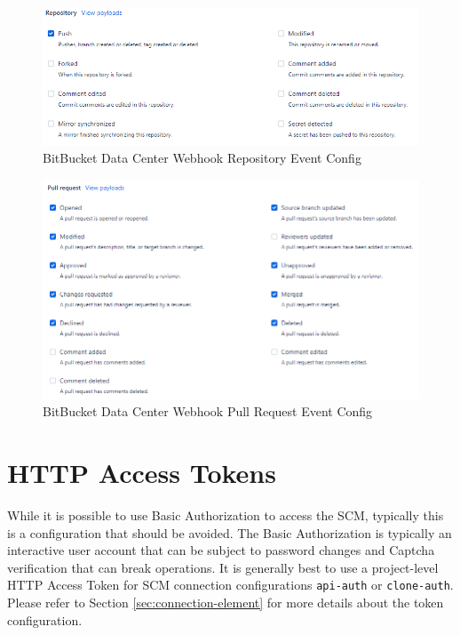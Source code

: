 \begin{figure}[h]
    \includegraphics[width=\textwidth]{graphics/bbdc-repository-event-config.png}
    \caption{BitBucket Data Center Webhook Repository Event Config}
    \label{fig:bbdc-repo-event-config}
\end{figure}

\begin{figure}[h]
    \includegraphics[width=\textwidth]{graphics/bbdc-pr-event-config.png}
    \caption{BitBucket Data Center Webhook Pull Request Event Config}
    \label{fig:bbdc-pr-event-config}
\end{figure}


\section{\cxoneflow HTTP Access Tokens}

While it is possible to use Basic Authorization to access the SCM, typically this is a configuration that
should be avoided.  The Basic Authorization is typically an interactive user account that can be subject
to password changes and Captcha verification that can break \cxoneflow operations.  It is generally
best to use a project-level HTTP Access Token for SCM connection configurations \texttt{api-auth} or
\texttt{clone-auth}.  Please refer to Section \ref{sec:connection-element} for more details about the token
configuration.

